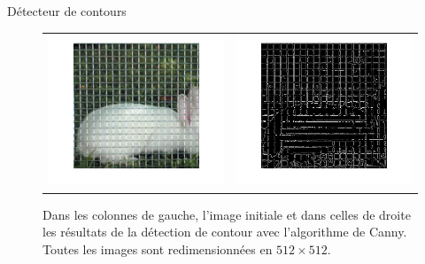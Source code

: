 \begin{frame}{Détecteur de contours}
\begin{figure}[ht!]
\centering
\begin{tabular}{cc}
\includegraphics[width = .5\columnwidth]{fig/lapin_rescale.png} &
\includegraphics[width = .5\columnwidth]{fig/contour_lapin.png}
\end{tabular}
\caption{Dans les colonnes de gauche, l'image initiale et dans celles de droite les résultats de la détection de contour avec l'algorithme de Canny. Toutes les images sont redimensionnées en $512\times 512$. }
\end{figure}
\end{frame}


